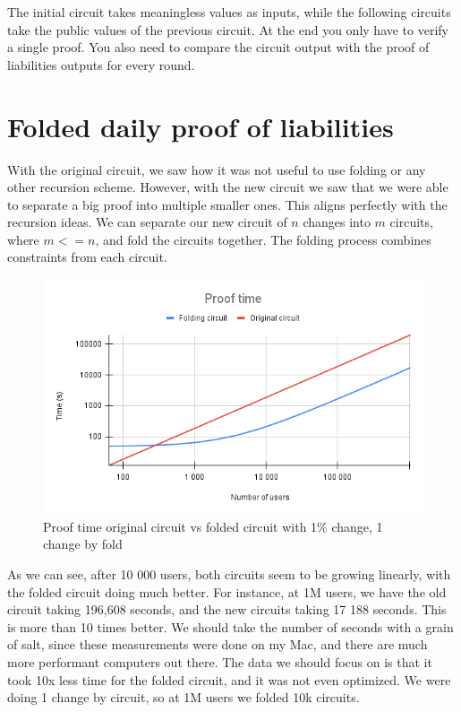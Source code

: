The initial circuit takes meaningless values as inputs, while the following circuits take the public values of the previous circuit.
At the end you only have to verify a single proof. You also need to compare the circuit output with the proof of liabilities outputs for every round.

\section{Folded daily proof of liabilities}
With the original circuit, we saw how it was not useful to use folding or any other recursion scheme.
However, with the new circuit we saw that we were able to separate a big proof into multiple smaller ones.
This aligns perfectly with the recursion ideas.
We can separate our new circuit of $n$ changes into $m$ circuits, where $m <= n$, and fold the circuits together. 
The folding process combines constraints from each circuit.

\begin{figure}[H]
   \centering
   \includegraphics[width=130mm]{Proof time.png}
   \caption{Proof time original circuit vs folded circuit with 1\% change, 1 change by fold}
   \label{overflow}
   \end{figure}

As we can see, after 10 000 users, both circuits seem to be growing linearly, with the folded circuit doing much better. For instance,
at 1M users, we have the old circuit taking 196,608 seconds, and the new circuits taking 17 188 seconds. This is more than 10 times better.
We should take the number of seconds with a grain of salt, since these measurements were done on my Mac, and there are much more performant computers out there.
The data we should focus on is that it took 10x less time for the folded circuit, and it was not even optimized. We were doing 1 change by circuit, so at 1M users we folded 10k circuits.

